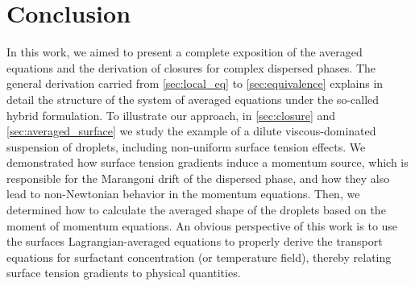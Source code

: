\section{Conclusion}
\label{sec:conclusion}




In this work, we aimed to present a complete exposition of the averaged equations and the derivation of closures for complex dispersed phases. 
The general derivation carried from \ref{sec:local_eq} to \ref{sec:equivalence} explains in detail the structure of the system of averaged equations under the so-called hybrid formulation.  
To illustrate our approach, in \ref{sec:closure} and \ref{sec:averaged_surface} we study the example of a dilute viscous-dominated suspension of droplets, including non-uniform surface tension effects. 
We demonstrated how surface tension gradients induce a momentum source, which is responsible for the Marangoni drift of the dispersed phase, and how they also lead to non-Newtonian behavior in the momentum equations. 
Then, we determined how to calculate the averaged shape of the droplets based on the moment of momentum equations. 
An obvious perspective of this work is to use the surfaces Lagrangian-averaged equations to properly derive the transport equations for surfactant concentration (or temperature field), thereby relating surface tension gradients to physical quantities.  


